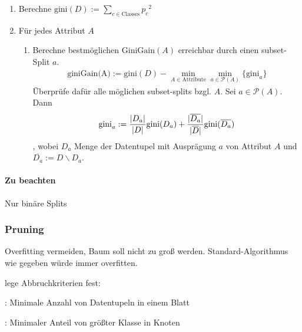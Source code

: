 \documentclass[10pt]{article} %
\DeclarePairedDelimiter\abs{\lvert}{\rvert}%
\begin{document}
\begin{enumerate}
\item Berechne $\text{gini}(D) := \sum_{c \in \text{Classes}} {p_c}^2$
\item Für jedes Attribut $A$
  \begin{enumerate}
  \item Berechne bestmöglichen $\text{GiniGain}(A)$ erreichbar durch einen
    subset-Split $a$.
    \begin{align*}
     \text{giniGain(A)} := \text{gini}(D) - \min_{A \in \text{Attribute}} \min_{a \in \mathcal{P}(A)} \{ \text{gini}_a \}
    \end{align*}
    Überprüfe dafür alle möglichen subset-splits bzgl. $A$. Sei $a
    \in \mathcal{P}(A)$. Dann
    \begin{align*}
      \text{gini}_a := \frac{\abs{D_a}}{\abs{D}} \text{gini}(D_a)
       + \frac{\abs{\overline{D_a}}}{\abs{\overline{D}}} \text{gini}(\overline{D_a})
    \end{align*}, wobei $D_a$ Menge der Datentupel mit Ausprägung $a$ von
    Attribut $A$ und $\overline{D_a} := D \backslash D_a$.
  \end{enumerate}
\end{enumerate}


\paragraph{Zu beachten} Nur binäre Splits 





\subsubsection{Pruning}
Overfitting vermeiden, Baum soll nicht zu groß werden. Standard-Algorithmus wie gegeben würde immer overfitten.

\begin{definition} lege Abbruchkriterien fest: 
   \begin{cptitemize} 
     \item \textbf{}: Minimale Anzahl von Datentupeln in einem Blatt
     \item \textbf{}: Minimaler Anteil von größter Klasse in Knoten 
   \end{cptitemize} 
\end{definition} 
\end{document}

